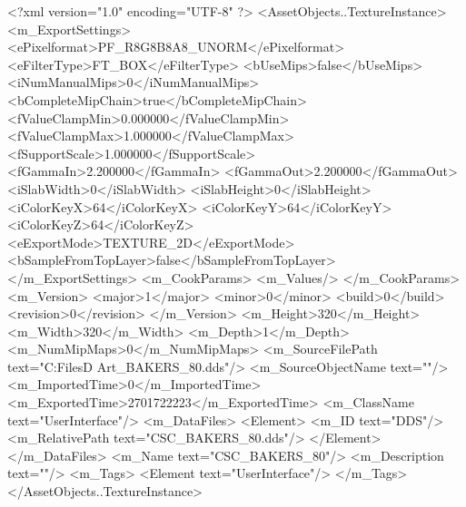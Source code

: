 <?xml version="1.0" encoding="UTF-8" ?>
<AssetObjects..TextureInstance>
	<m_ExportSettings>
		<ePixelformat>PF_R8G8B8A8_UNORM</ePixelformat>
		<eFilterType>FT_BOX</eFilterType>
		<bUseMips>false</bUseMips>
		<iNumManualMips>0</iNumManualMips>
		<bCompleteMipChain>true</bCompleteMipChain>
		<fValueClampMin>0.000000</fValueClampMin>
		<fValueClampMax>1.000000</fValueClampMax>
		<fSupportScale>1.000000</fSupportScale>
		<fGammaIn>2.200000</fGammaIn>
		<fGammaOut>2.200000</fGammaOut>
		<iSlabWidth>0</iSlabWidth>
		<iSlabHeight>0</iSlabHeight>
		<iColorKeyX>64</iColorKeyX>
		<iColorKeyY>64</iColorKeyY>
		<iColorKeyZ>64</iColorKeyZ>
		<eExportMode>TEXTURE_2D</eExportMode>
		<bSampleFromTopLayer>false</bSampleFromTopLayer>
	</m_ExportSettings>
	<m_CookParams>
		<m_Values/>
	</m_CookParams>
	<m_Version>
		<major>1</major>
		<minor>0</minor>
		<build>0</build>
		<revision>0</revision>
	</m_Version>
	<m_Height>320</m_Height>
	<m_Width>320</m_Width>
	<m_Depth>1</m_Depth>
	<m_NumMipMaps>0</m_NumMipMaps>
	<m_SourceFilePath text="C:\Users\Shadow\Desktop\Working Files\2D Art\Quarters\Bakers\CSC_BAKERS_80.dds"/>
	<m_SourceObjectName text=""/>
	<m_ImportedTime>0</m_ImportedTime>
	<m_ExportedTime>2701722223</m_ExportedTime>
	<m_ClassName text="UserInterface"/>
	<m_DataFiles>
		<Element>
			<m_ID text="DDS"/>
			<m_RelativePath text="CSC_BAKERS_80.dds"/>
		</Element>
	</m_DataFiles>
	<m_Name text="CSC_BAKERS_80"/>
	<m_Description text=""/>
	<m_Tags>
		<Element text="UserInterface"/>
	</m_Tags>
</AssetObjects..TextureInstance>

